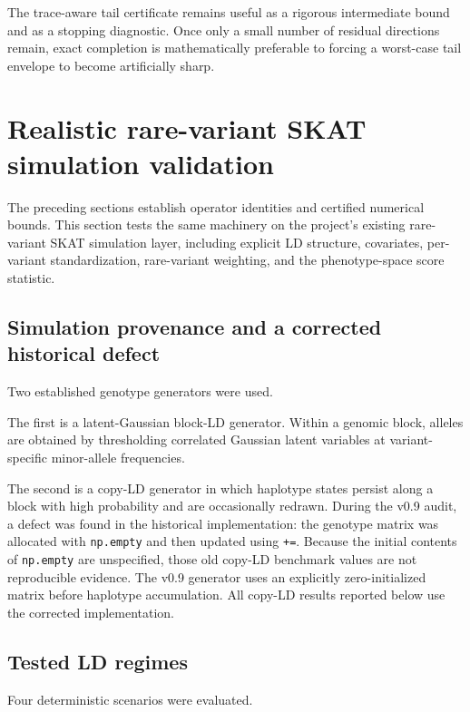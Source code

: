 \documentclass[11pt]{article}
\theoremstyle{definition}
\theoremstyle{remark}
\begin{document}
The trace-aware tail certificate remains useful as a rigorous intermediate
bound and as a stopping diagnostic.  Once only a small number of residual
directions remain, exact completion is mathematically preferable to forcing a
worst-case tail envelope to become artificially sharp.

\section{Realistic rare-variant SKAT simulation validation}

The preceding sections establish operator identities and certified numerical
bounds.  This section tests the same machinery on the project's existing
rare-variant SKAT simulation layer, including explicit LD structure,
covariates, per-variant standardization, rare-variant weighting, and the
phenotype-space score statistic.

\subsection{Simulation provenance and a corrected historical defect}

Two established genotype generators were used.

The first is a latent-Gaussian block-LD generator.  Within a genomic block,
alleles are obtained by thresholding correlated Gaussian latent variables at
variant-specific minor-allele frequencies.

The second is a copy-LD generator in which haplotype states persist along a
block with high probability and are occasionally redrawn.  During the v0.9
audit, a defect was found in the historical implementation: the genotype
matrix was allocated with \verb|np.empty| and then updated using \verb|+=|.
Because the initial contents of \verb|np.empty| are unspecified, those old
copy-LD benchmark values are not reproducible evidence.  The v0.9 generator
uses an explicitly zero-initialized matrix before haplotype accumulation.
All copy-LD results reported below use the corrected implementation.

\subsection{Tested LD regimes}

Four deterministic scenarios were evaluated.
\end{document}

